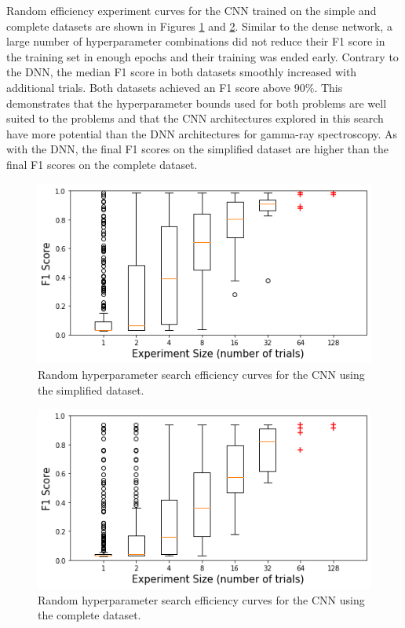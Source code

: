 Random efficiency experiment curves for the CNN trained on the simple and complete datasets are shown in Figures \ref{fig:random_hp_search_cnn_easy} and \ref{fig:random_hp_search_cnn_full}. Similar to the dense network, a large number of hyperparameter combinations did not reduce their F1 score in the training set in enough epochs and their training was ended early. Contrary to the DNN, the median F1 score in both datasets smoothly increased with additional trials. Both datasets achieved an F1 score above 90$\%$. This demonstrates that the hyperparameter bounds used for both problems are well suited to the problems and that the CNN architectures explored in this search have more potential than the DNN architectures for gamma-ray spectroscopy. As with the DNN, the final F1 scores on the simplified dataset are higher than the final F1 scores on the complete dataset.

\begin{figure}[H]
	\centering
	\includegraphics[width=0.8\linewidth]{images/random_hp_search_cnn_easy}
	\caption{Random hyperparameter search efficiency curves for the CNN using the simplified dataset.}
	\label{fig:random_hp_search_cnn_easy}
\end{figure}

\begin{figure}[H]
	\centering
	\includegraphics[width=0.8\linewidth]{images/random_hp_search_cnn_full}
	\caption{Random hyperparameter search efficiency curves for the CNN using the complete dataset.}
	\label{fig:random_hp_search_cnn_full}
\end{figure}


